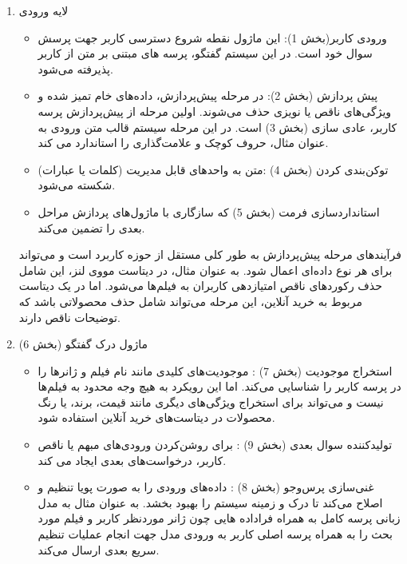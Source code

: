 \begin{enumerate}
\item
 لایه ورودی
\begin{itemize}
\item
ورودی کاربر(بخش 1): این ماژول نقطه شروع دسترسی کاربر جهت پرسش سوال خود است. در این سیستم گفتگو، پرسه های مبتنی بر متن از کاربر پذیرفته می‌شود.
\item
پیش پردازش (بخش 2):
در مرحله پیش‌پردازش، داده‌های خام تمیز شده و ویژگی‌های ناقص یا نویزی حذف می‌شوند. اولین مرحله از پیش‌پردازش پرسه کاربر، 
عادی سازی%
  (بخش 3) است. در این مرحله سیستم قالب متن ورودی به عنوان مثال، حروف کوچک و علامت‌گذاری را استاندارد می کند.
\item
توکن‌بندی کردن%
 (بخش 4) :متن به واحدهای قابل مدیریت (کلمات یا عبارات) شکسته می‌شود.
\item
استاندارد‌سازی فرمت%
 (بخش 5) که سازگاری با ماژول‌های پردازش مراحل بعدی را تضمین می‌کند.
\end{itemize}

فرآیندهای مرحله پیش‌پردازش به طور کلی مستقل از حوزه کاربرد است و می‌تواند برای هر نوع داده‌ای اعمال شود. به عنوان مثال، در دیتاست مووی لنز، این شامل حذف رکوردهای ناقص امتیازدهی کاربران به فیلم‌ها می‌شود. اما در یک دیتاست مربوط به خرید آنلاین، این مرحله می‌تواند شامل حذف محصولاتی باشد که توضیحات ناقص دارند.
\item
 ماژول درک گفتگو (بخش 6)
\begin{itemize}
\item
استخراج موجودیت%
 (بخش 7) : موجودیت‌های کلیدی مانند نام فیلم و ژانرها را در پرسه کاربر را شناسایی می‌کند. اما این رویکرد به هیچ وجه محدود به فیلم‌ها نیست و می‌تواند برای استخراج ویژگی‌های دیگری مانند قیمت، برند، یا رنگ محصولات در دیتاست‌های خرید آنلاین استفاده شود.
\item
تولید‌کننده سوال بعدی%
 (بخش 9) : برای روشن‌کردن ورودی‌های مبهم یا ناقص کاربر، درخواست‌های بعدی ایجاد می کند.
\item
غنی‌سازی پرس‌وجو%
 (بخش 8) : داده‌های ورودی را به صورت پویا تنظیم و اصلاح می‌کند تا درک و زمینه سیستم را بهبود بخشد. به عنوان مثال به مدل زبانی پرسه کامل به همراه فراداده هایی چون ژانر موردنظر کاربر و فیلم مورد بحث را به همراه پرسه اصلی کاربر به ورودی مدل جهت انجام عملیات تنظیم سریع بعدی ارسال می‌کند.
\end{itemize}


\end{enumerate}

